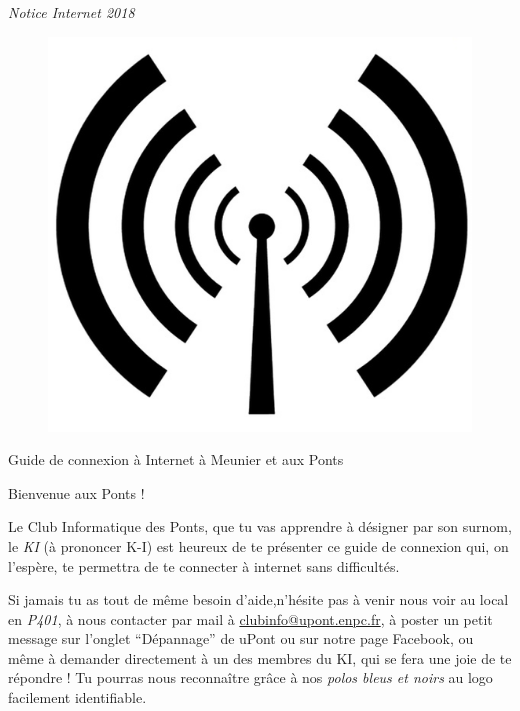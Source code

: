 \documentclass{../templates/enpc-ki/ki020}
\begin{document}
  \Header{}

  \begin{center}
    {\Huge \emph{Notice Internet 2018}}
  \end{center}

  \begin{figure}[H]
    \centering
    \includegraphics{page1}
  \end{figure}


  \begin{center}
    \Huge{Guide de connexion à Internet à Meunier et aux Ponts}
  \end{center}
  \thispagestyle{empty}
  \Footer


  \newpage

    \vspace{2cm}
    Bienvenue aux Ponts !

    Le Club Informatique des Ponts, que tu vas apprendre à désigner par son surnom, le \emph{KI} (à prononcer K-I) est heureux de te présenter ce guide de connexion qui, on l'espère, te permettra de te connecter à internet sans difficultés.

    Si jamais tu as tout de même besoin d'aide,n'hésite pas à venir nous voir au local en \emph{P401}, à nous contacter par mail à \href{mailto:clubinfo@upont.enpc.fr}{clubinfo@upont.enpc.fr}, à poster un petit message sur l’onglet “Dépannage” de uPont ou sur notre page Facebook, ou même à demander directement à un des membres du KI, qui se fera une joie de te répondre ! Tu pourras nous reconnaître grâce à nos \emph{polos bleus et noirs} au logo facilement identifiable.\\[2.0cm]
\end{document}

